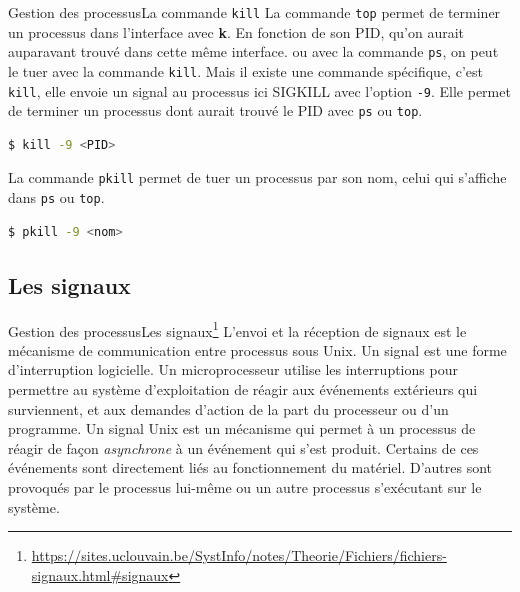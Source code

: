 \documentclass{beamer}
\begin{document}
    \begin{frame}[fragile]{Gestion des processus}{La commande \lstinline{kill}}
        La commande \lstinline{top} permet de terminer un processus dans l'interface avec \textbf{k}.
        En fonction de son PID, qu'on aurait auparavant trouvé dans cette même interface.
        ou avec la commande \lstinline{ps}, on peut le tuer avec la commande \lstinline{kill}.
        \bigbreak
        Mais il existe une commande spécifique, c'est \lstinline{kill}, elle envoie un signal au processus ici SIGKILL avec l'option \lstinline{-9}.
        Elle permet de terminer un processus dont aurait trouvé le PID avec \lstinline{ps} ou \lstinline{top}.
        \begin{lstlisting}[language=bash]
$ kill -9 <PID>
        \end{lstlisting}
        \bigbreak
        La commande \lstinline{pkill} permet de tuer un processus par son nom, celui qui s'affiche dans \lstinline{ps} ou \lstinline{top}.
        \begin{lstlisting}[language=bash]
$ pkill -9 <nom>
        \end{lstlisting}
    \end{frame}

    \subsection{Les signaux}\label{subsec:signals}

    \begin{frame}{Gestion des processus}{Les signaux\footnote{\label{uclouvain-signaux}\url{https://sites.uclouvain.be/SystInfo/notes/Theorie/Fichiers/fichiers-signaux.html\#signaux}}}
        L'envoi et la réception de signaux est le mécanisme de communication  entre processus sous Unix.
        Un signal est une forme d'interruption logicielle.
        Un microprocesseur utilise les interruptions pour permettre au système d'exploitation de réagir aux événements extérieurs qui surviennent, et aux demandes d'action de la part du processeur ou d'un programme.
        Un signal Unix est un mécanisme qui permet à un processus de réagir de façon \textit{asynchrone} à un événement qui s'est produit.
        Certains de ces événements sont directement liés au fonctionnement du matériel.
        D'autres sont provoqués par le processus lui-même ou un autre processus s'exécutant sur le système.
    \end{frame}
\end{document}
